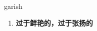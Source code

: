 
\begin{frame}
{\huge garish}
\begin{center}
\begin{enumerate}\Large
  \item \textbf{过于鲜艳的，过于张扬的}
\end{enumerate}
\end{center}
\end{frame}
